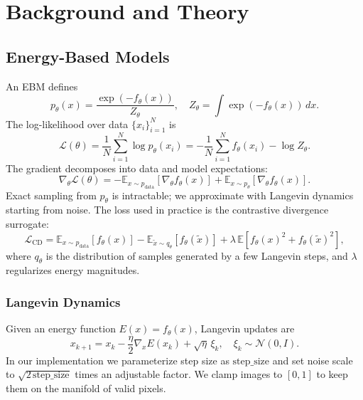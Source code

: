 \documentclass[conference]{IEEEtran}
\begin{document}
\section{Background and Theory}
\subsection{Energy-Based Models}
An EBM defines
\begin{equation}
    p_\theta(x) = \frac{\exp(-f_\theta(x))}{Z_\theta}, \quad Z_\theta = \int \exp(-f_\theta(x)) \, dx.
\end{equation}
The log-likelihood over data $\{x_i\}_{i=1}^N$ is
\begin{equation}
    \mathcal{L}(\theta) = \frac{1}{N} \sum_{i=1}^N \log p_\theta(x_i) = -\frac{1}{N} \sum_{i=1}^N f_\theta(x_i) - \log Z_\theta.
\end{equation}
The gradient decomposes into data and model expectations:
\begin{equation}
    \nabla_\theta \mathcal{L}(\theta) = - \mathbb{E}_{x \sim p_{\text{data}}}[\nabla_\theta f_\theta(x)] + \mathbb{E}_{x \sim p_\theta}[\nabla_\theta f_\theta(x)].
\end{equation}
Exact sampling from $p_\theta$ is intractable; we approximate with Langevin dynamics starting from noise. The loss used in practice is the contrastive divergence surrogate:
\begin{equation}
    \mathcal{L}_{\text{CD}} = \mathbb{E}_{x \sim p_{\text{data}}}[f_\theta(x)] - \mathbb{E}_{\tilde{x} \sim q_\theta} [f_\theta(\tilde{x})] + \lambda \, \mathbb{E}[f_\theta(x)^2 + f_\theta(\tilde{x})^2],
\end{equation}
where $q_\theta$ is the distribution of samples generated by a few Langevin steps, and $\lambda$ regularizes energy magnitudes.

\subsubsection{Langevin Dynamics}
Given an energy function $E(x) = f_\theta(x)$, Langevin updates are
\begin{equation}
    x_{k+1} = x_k - \frac{\eta}{2} \nabla_x E(x_k) + \sqrt{\eta} \, \xi_k, \quad \xi_k \sim \mathcal{N}(0, I).
\end{equation}
In our implementation we parameterize step size as $\text{step\_size}$ and set noise scale to $\sqrt{2\,\text{step\_size}}$ times an adjustable factor. We clamp images to $[0,1]$ to keep them on the manifold of valid pixels.
\end{document}
